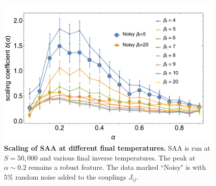\begin{figure}[t]
\begin{center}
\includegraphics[width=\columnwidth]{chapters/Planted/SAA-all-betas.pdf}
\caption{\textbf{Scaling of SAA at different final temperatures.} SAA is run at $S=50,\!000$ and various final inverse temperatures. The peak at $\alpha\sim 0.2$ remains a robust feature. The data marked ``Noisy" is with $5\%$ random noise added to the couplings $J_{ij}$.}
\label{fig:SAA-slope}
\end{center}
\end{figure}



